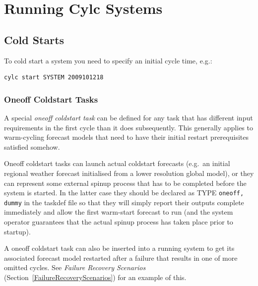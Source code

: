 \documentclass[11pt,a4paper]{article}
\begin{document}

%
%
%

\lstset{language=}


\pagebreak
\section{Running Cylc Systems}
\label{RunningCylcSystems}

\subsection{Cold Starts}

To cold start a system you need to specify an initial cycle time, e.g.:

\begin{lstlisting}
cylc start SYSTEM 2009101218
\end{lstlisting}

\subsubsection{Oneoff Coldstart Tasks}

A special {\em oneoff coldstart task} can be defined for any task
that has different input requirements in the first cycle than it does
subsequently. This generally applies to warm-cycling forecast models
that need to have their initial restart prerequisites satisfied somehow. 

Oneoff coldstart tasks can launch actual coldstart forecasts (e.g.\ an
initial regional weather forecast initialised from a lower resolution
global model), or they can represent some external spinup process that
has to be completed before the system is started. In the latter case
they should be declared as TYPE \lstinline=oneoff, dummy= in the taskdef
file so that they will simply report their outputs complete immediately
and allow the first warm-start forecast to run (and the system operator
guarantees that the actual spinup process has taken place prior to
startup).

A oneoff coldstart task can also be inserted into a running system to
get its associated forecast model restarted after a failure that results
in one of more omitted cycles. See {\em Failure Recovery Scenarios}
(Section~\ref{FailureRecoveryScenarios}) for an example of this. 
\end{document}
